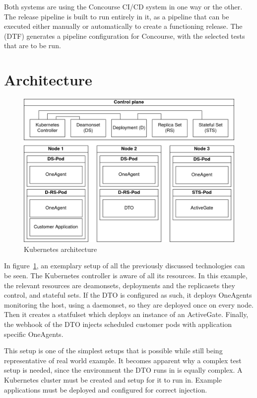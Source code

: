 Both systems are using the Concourse CI/CD system in one way or the other.
The release pipeline is built to run entirely in it, as a pipeline that can be executed either manually or automatically to create a functioning release.
The (DTF) generates a pipeline configuration for Concourse, with the selected tests that are to be run.

\section{Architecture}\label{sec:architecture}

\begin{figure}[h]
    \centering
    \includegraphics[width=\textwidth]{img/context/kubernetes}
    \caption{Kubernetes architecture}
    \label{fig:kubernetes-architecture}
\end{figure}

In figure~\ref{fig:kubernetes-architecture}, an exemplary setup of all the previously discussed technologies can be seen.
The Kubernetes controller is aware of all its resources.
In this example, the relevant resources are deamonsets, deployments and the replicasets they control, and stateful sets.
If the DTO is configured as such, it deploys OneAgents monitoring the host, using a daemonset, so they are deployed once on every node.
Then it creates a statfulset which deploys an instance of an ActiveGate.
Finally, the webhook of the DTO injects scheduled customer pods with application specific OneAgents.

This setup is one of the simplest setups that is possible while still being representative of real world example.
It becomes apparent why a complex test setup is needed, since the environment the DTO runs in is equally complex.
A Kubernetes cluster must be created and setup for it to run in.
Example applications must be deployed and configured for correct injection.

